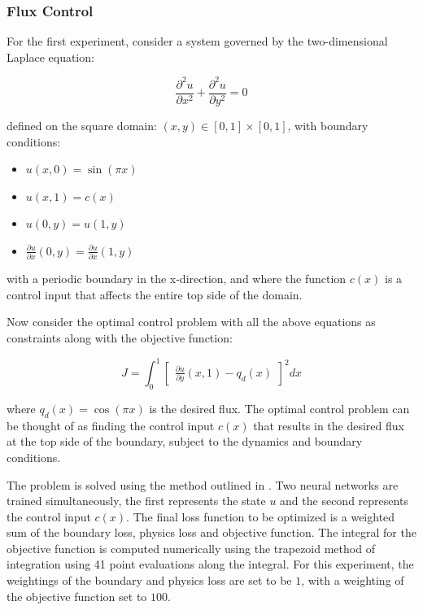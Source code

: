 \subsubsection{Flux Control}

For the first experiment, consider a system governed by the two-dimensional Laplace equation:

\begin{equation}
    \frac{\partial^2 u}{\partial x^2} + \frac{\partial^2 u}{\partial y^2} = 0
\end{equation}

\noindent defined on the square domain: $(x, y) \in [0, 1] \times [0, 1]$, with boundary conditions:

\begin{itemize}
    \item $u(x, 0) = \sin (\pi x)$
    \item $u(x, 1) = c(x)$
    \item $u(0, y) = u(1, y)$
    \item $\frac{\partial u}{\partial x}(0, y) = \frac{\partial u}{\partial x}(1, y)$
\end{itemize}

\noindent with a periodic boundary in the x-direction, and where the function $c(x)$ is a control input that affects the entire top side of the domain.

Now consider the optimal control problem with all the above equations as constraints along with the objective function:

\begin{equation}
    J = \int_ {0}^{1} \begin{bmatrix} \frac{\partial u}{\partial y}(x, 1) - q_d(x) \end{bmatrix}^2 dx
\end{equation}

\noindent where $q_d(x) = \cos (\pi x)$ is the desired flux. The optimal control problem can be thought of as finding the control input $c(x)$ that results in the desired flux at the top side of the boundary, subject to the dynamics and boundary conditions.

The problem is solved using the method outlined in \cite{pinnoptimalcontrol}. Two neural networks are trained simultaneously, the first represents the state $u$ and the second represents the control input $c(x)$. The final loss function to be optimized is a weighted sum of the boundary loss, physics loss and objective function. The integral for the objective function is computed numerically using the trapezoid method of integration using 41 point evaluations along the integral. For this experiment, the weightings of the boundary and physics loss are set to be $1$, with a weighting of the objective function set to $100$.


